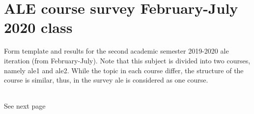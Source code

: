 \chapter{ALE course survey February-July 2020 class}\label{appendices:survey}
Form template and results for the second academic semester 2019-2020 \acrshort{ale} iteration (from February-July). Note that this subject is divided into two courses, namely \acrshort{ale}1 and \acrshort{ale}2. While the topic in each course differ, the structure of the course is similar, thus, in the survey \acrshort{ale} is considered as one course.
\\\\
\begin{minipage}{0.5\textwidth}
\begin{flushleft}
\end{flushleft}
\end{minipage}
\hfill
\begin{minipage}{0.5\textwidth}
\begin{flushright}
   See next page
\end{flushright}
\end{minipage}



